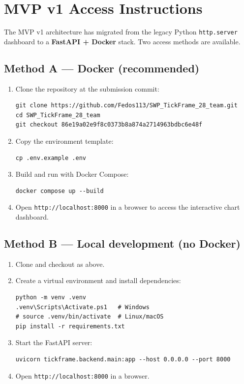 \documentclass[11pt,a4paper]{article}
\begin{document}
\section{MVP v1 Access Instructions}

The MVP v1 architecture has migrated from the legacy Python \texttt{http.server} dashboard to a \textbf{FastAPI + Docker} stack. Two access methods are available.

\subsection{Method A — Docker (recommended)}

\begin{enumerate}[leftmargin=*]
    \item Clone the repository at the submission commit:
\begin{verbatim}
git clone https://github.com/Fedos113/SWP_TickFrame_28_team.git
cd SWP_TickFrame_28_team
git checkout 86e19a02e9f8c0373b8a874a2714963bdbc6e48f
\end{verbatim}

    \item Copy the environment template:
\begin{verbatim}
cp .env.example .env
\end{verbatim}

    \item Build and run with Docker Compose:
\begin{verbatim}
docker compose up --build
\end{verbatim}

    \item Open \texttt{http://localhost:8000} in a browser to access the interactive chart dashboard.
\end{enumerate}

\subsection{Method B — Local development (no Docker)}

\begin{enumerate}[leftmargin=*]
    \item Clone and checkout as above.
    \item Create a virtual environment and install dependencies:
\begin{verbatim}
python -m venv .venv
.venv\Scripts\Activate.ps1   # Windows
# source .venv/bin/activate  # Linux/macOS
pip install -r requirements.txt
\end{verbatim}

    \item Start the FastAPI server:
\begin{verbatim}
uvicorn tickframe.backend.main:app --host 0.0.0.0 --port 8000
\end{verbatim}

    \item Open \texttt{http://localhost:8000} in a browser.
\end{enumerate}
\end{document}

